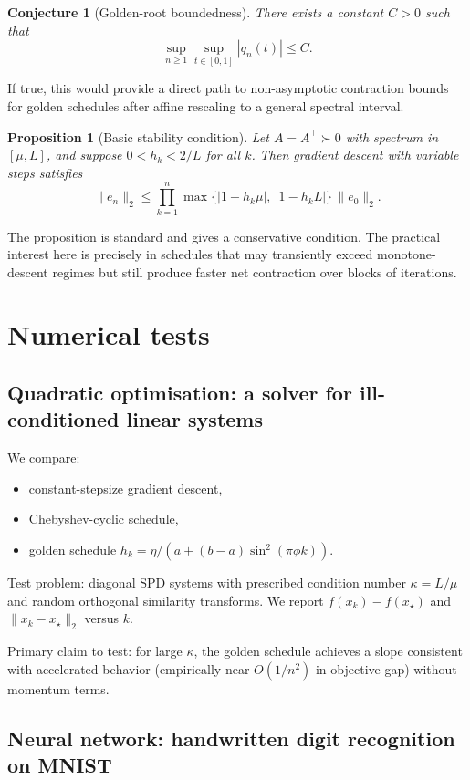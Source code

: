 \documentclass{article}
\newtheorem{proposition}{Proposition}
\newtheorem{conjecture}{Conjecture}
\begin{document}
\begin{conjecture}[Golden-root boundedness]
There exists a constant $C>0$ such that
\[
\sup_{n\ge 1}\sup_{t\in[0,1]}|q_n(t)|\le C.
\]
\end{conjecture}

If true, this would provide a direct path to non-asymptotic contraction bounds for
golden schedules after affine rescaling to a general spectral interval.

\begin{proposition}[Basic stability condition]
Let $A=A^\top\succ 0$ with spectrum in $[\mu,L]$, and suppose
$0<h_k<2/L$ for all $k$. Then gradient descent with variable steps satisfies
\[
\|e_n\|_2\le \prod_{k=1}^n \max\{|1-h_k\mu|,\ |1-h_kL|\}\,\|e_0\|_2.
\]
\end{proposition}

The proposition is standard and gives a conservative condition. The practical interest
here is precisely in schedules that may transiently exceed monotone-descent regimes but
still produce faster net contraction over blocks of iterations.

\section{Numerical tests}

\subsection{Quadratic optimisation: a solver for ill-conditioned linear systems}

We compare:
\begin{itemize}
\item constant-stepsize gradient descent,
\item Chebyshev-cyclic schedule,
\item golden schedule $h_k=\eta/(a+(b-a)\sin^2(\pi\phi k))$.
\end{itemize}

Test problem: diagonal SPD systems with prescribed condition number
$\kappa=L/\mu$ and random orthogonal similarity transforms. We report
$f(x_k)-f(x_\star)$ and $\|x_k-x_\star\|_2$ versus $k$.

Primary claim to test: for large $\kappa$, the golden schedule achieves a slope
consistent with accelerated behavior (empirically near $O(1/n^2)$ in objective gap)
without momentum terms.

\subsection{Neural network: handwritten digit recognition on MNIST}
\end{document}
